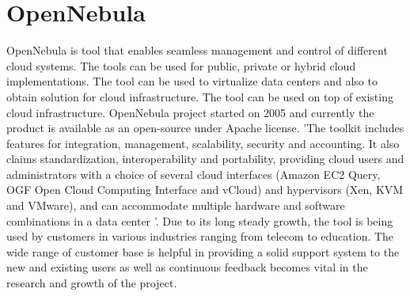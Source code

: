 \section{OpenNebula}

OpenNebula is tool that enables seamless management and control of different cloud systems.
The tools can be used for public, private or hybrid cloud implementations.
The tool can be used to virtualize data centers and also to obtain solution for cloud infrastructure.
The tool can be used on top of existing cloud infrastructure.
OpenNebula project started on 2005 and currently the product is available as an open-source under Apache license.
'The toolkit includes features for integration, management, scalability, security and accounting.
It also claims standardization, interoperability and portability, providing cloud users and administrators with a choice of several
cloud interfaces (Amazon EC2 Query, OGF Open Cloud Computing Interface and vCloud) and hypervisors
(Xen, KVM and VMware), and can accommodate multiple hardware and software combinations in a data center 
\cite{hid-sp18-417-opennebula-wiki}'.
Due to its long steady growth, the tool is being used by customers in various industries ranging from telecom to education.
The wide range of customer base is helpful in providing a solid support system to the new and existing users as well as continuous
feedback becomes vital in the research and growth of the project. 
